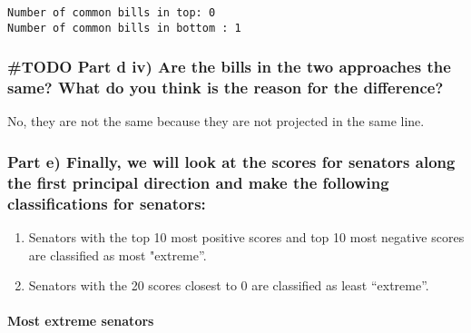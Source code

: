 \documentclass[11pt]{article}
\providecommand{\tightlist}{%
      \setlength{\itemsep}{0pt}\setlength{\parskip}{0pt}}
\begin{document}
    \begin{Verbatim}[commandchars=\\\{\}]
Number of common bills in top: 0
Number of common bills in bottom : 1

    \end{Verbatim}

    \hypertarget{todo-part-d-iv-are-the-bills-in-the-two-approaches-the-same-what-do-you-think-is-the-reason-for-the-difference}{%
\subsubsection{\#TODO Part d iv) Are the bills in the two approaches the
same? What do you think is the reason for the
difference?}\label{todo-part-d-iv-are-the-bills-in-the-two-approaches-the-same-what-do-you-think-is-the-reason-for-the-difference}}

    No, they are not the same because they are not projected in the same
line.

    \hypertarget{part-e-finally-we-will-look-at-the-scores-for-senators-along-the-first-principal-direction-and-make-the-following-classifications-for-senators}{%
\subsubsection{Part e) Finally, we will look at the scores for senators
along the first principal direction and make the following
classifications for
senators:}\label{part-e-finally-we-will-look-at-the-scores-for-senators-along-the-first-principal-direction-and-make-the-following-classifications-for-senators}}

\begin{enumerate}
\def\labelenumi{\alph{enumi})}
\tightlist
\item
  Senators with the top 10 most positive scores and top 10 most negative
  scores are classified as most "extreme''.
\item
  Senators with the 20 scores closest to 0 are classified as least
  ``extreme''.
\end{enumerate}

    \hypertarget{most-extreme-senators}{%
\paragraph{Most extreme senators}\label{most-extreme-senators}}
\end{document}
